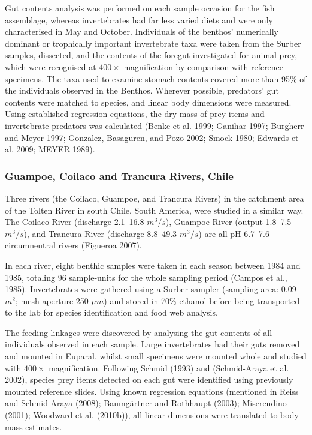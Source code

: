 \documentclass{article}
\begin{document}
Gut contents analysis was performed on each sample occasion for the fish
assemblage, whereas invertebrates had far less varied diets and were
only characterised in May and October. Individuals of the benthos'
numerically dominant or trophically important invertebrate taxa were
taken from the Surber samples, dissected, and the contents of the
foregut investigated for animal prey, which were recognised at
\(400\times\) magnification by comparison with reference specimens. The
taxa used to examine stomach contents covered more than 95\% of the
individuals observed in the Benthos. Wherever possible, predators' gut
contents were matched to species, and linear body dimensions were
measured. Using established regression equations, the dry mass of prey
items and invertebrate predators was calculated (Benke et al. 1999;
Ganihar 1997; Burgherr and Meyer 1997; Gonzalez, Basaguren, and Pozo
2002; Smock 1980; Edwards et al. 2009; MEYER 1989).

\hypertarget{guampoe-coilaco-and-trancura-rivers-chile}{%
\subsubsection{Guampoe, Coilaco and Trancura Rivers,
Chile}\label{guampoe-coilaco-and-trancura-rivers-chile}}

Three rivers (the Coilaco, Guampoe, and Trancura Rivers) in the
catchment area of the Tolten River in south Chile, South America, were
studied in a similar way. The Coilaco River (discharge 2.1--16.8
\(m^3/s\)), Guampoe River (output 1.8--7.5 \(m^3/s\)), and Trancura
River (discharge 8.8--49.3 \(m^3/s\)) are all pH 6.7--7.6 circumneutral
rivers (Figueroa 2007).

In each river, eight benthic samples were taken in each season between
1984 and 1985, totaling 96 sample-units for the whole sampling period
(Campos et al., 1985). Invertebrates were gathered using a Surber
sampler (sampling area: 0.09 \(m^2\); mesh aperture 250 \(\mu m\)) and
stored in 70\% ethanol before being transported to the lab for species
identification and food web analysis.

The feeding linkages were discovered by analysing the gut contents of
all individuals observed in each sample. Large invertebrates had their
guts removed and mounted in Euparal, whilst small specimens were mounted
whole and studied with \(400\times\) magnification. Following Schmid
(1993) and (Schmid-Araya et al. 2002), species prey items detected on
each gut were identified using previously mounted reference slides.
Using known regression equations (mentioned in Reiss and Schmid-Araya
(2008); Baumgärtner and Rothhaupt (2003); Miserendino (2001); Woodward
et al. (2010b)), all linear dimensions were translated to body mass
estimates.
\end{document}
